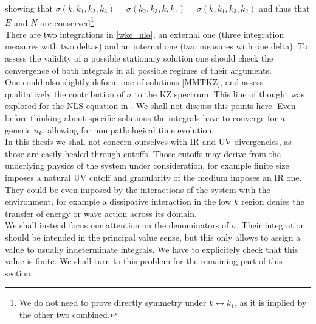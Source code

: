     showing that $\sigma(k,k_1,k_2,k_3) = \sigma(k_2,k_3,k,k_1) = \sigma(k,k_1,k_3,k_2)$ and thus that $E$ and $N$ are conserved\footnote{
    We do not need to prove directly symmetry under $k \leftrightarrow k_1$, as it is implied by the other two combined.}.\\ 
    There are two integrations in \eqref{wke_nlo}, an external one (three integration measures with two deltas) and an internal one (two measures with one delta). 
    To assess the validity of a possible stationary solution one should check the convergence of both integrals in all possible regimes of their arguments.\\ One could also
    slightly deform one of solutions \eqref{MMTKZ}, and assess qualitatively the contribution of $\sigma$ to the KZ spectrum. This line of thought 
    was explored for the NLS equation in \cite{Rosenhaus:2025mgj}. We shall not discuss this points here. Even before thinking about specific solutions 
    the integrals have to converge for a generic $n_k$, allowing for non pathological time evolution.\\
    In this thesis we shall not concern ourselves with IR and UV divergencies,
    as those are easily healed through cutoffs. Those cutoffs may derive from the underlying physics of the system under consideration, for example 
    finite size imposes a natural UV cutoff and granularity of the medium imposes an IR one. They could be even imposed by the interactions of the system with 
    the environment, for example a dissipative interaction in the low $k$ region denies the transfer of energy or wave action across its domain. \\
    We shall instead focus our attention on the denominators of $\sigma$. Their integration should be intended in the principal value sense, but this only allows to 
    assign a value to usually indeterminate integrals. We have to explicitely check that this value is finite. We shall turn to this problem for the remaining part 
    of this section.\\


